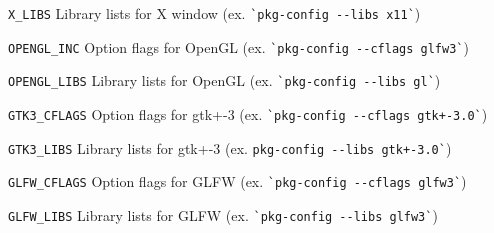 \begin{description}
\item{\verb|X_LIBS|}   Library lists for X window (ex.    \verb|`pkg-config --libs x11`|)
\item{\verb|OPENGL_INC|} Option flags for OpenGL  (ex.    \verb|`pkg-config --cflags glfw3`|)
\item{\verb|OPENGL_LIBS|}   Library lists for OpenGL (ex. \verb|`pkg-config --libs gl`|)
\item{\verb|GTK3_CFLAGS|} Option flags for gtk+-3  (ex.   \verb|`pkg-config --cflags gtk+-3.0`|)
\item{\verb|GTK3_LIBS|}   Library lists for gtk+-3 (ex.   \verb|pkg-config --libs gtk+-3.0`|)
\item{\verb|GLFW_CFLAGS|} Option flags for GLFW  (ex.     \verb|`pkg-config --cflags glfw3`|)
\item{\verb|GLFW_LIBS|}   Library lists for GLFW (ex.     \verb|`pkg-config --libs glfw3`|)
\end{description}
%

